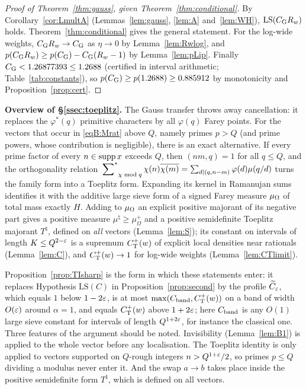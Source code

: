 \documentclass[11pt]{amsart}
\theoremstyle{definition}
\theoremstyle{remark}
\numberwithin{equation}{section}
\newcommand{\inputlemma}[1]{}
\begin{document}
\inputlemma{lemma-A}

\begin{proof}[Proof of Theorem~\ref{thm:gauss}, given Theorem~\ref{thm:conditional}]
By Corollary~\ref{cor:LmultA} (Lemmas~\ref{lem:gauss}, \ref{lem:A} and~\ref{lem:WH}), $\mathrm{LS}(C_{\mathrm G}R_w)$ holds. Theorem~\ref{thm:conditional} gives the general statement. For the log-wide weights, $C_{\mathrm G} R_w\to C_{\mathrm G}$ as $\eta\to0$ by Lemma~\ref{lem:Rwlog}, and $p(C_{\mathrm G}R_w)\ge p(C_{\mathrm G})-C_{\mathrm G}(R_w-1)$ by Lemma~\ref{lem:pLip}. Finally $C_{\mathrm G}<1.26877393\le1.2688$ (certified in interval arithmetic; Table~\ref{tab:constants}), so $p(C_{\mathrm G})\ge p(1.2688)\ge0.885912$ by monotonicity and Proposition~\ref{prop:cert}.
\end{proof}

\medskip\noindent\textbf{Overview of \S\ref{ssec:toeplitz}.} The Gauss transfer throws away cancellation: it replaces the $\varphi^*(q)$ primitive characters by all $\varphi(q)$ Farey points. For the vectors that occur in \eqref{eqB:Mrat} above $Q$, namely primes $p>Q$ (and prime powers, whose contribution is negligible), there is an exact alternative. If every prime factor of every $n\in\operatorname{supp} x$ exceeds $Q$, then $(nm,q)=1$ for all $q\le Q$, and the orthogonality relation $\sideset{}{^{*}}\sum_{\chi\bmod q}\chi(n)\overline{\chi(m)}=\sum_{d\mid(q,n-m)}\varphi(d)\mu(q/d)$ turns the family form into a Toeplitz form. Expanding its kernel in Ramanujan sums identifies it with the additive large sieve form of a signed Farey measure $\mu_{\Omega}$ of total mass exactly $H$. Adding to $\mu_{\Omega}$ an explicit positive majorant of its negative part gives a positive measure $\mu^\natural\ge\mu_\Omega^+$ and a positive semidefinite Toeplitz majorant $T^\natural$, defined on \emph{all} vectors (Lemma~\ref{lem:S}); its constant on intervals of length $K\le Q^{2-\varepsilon}$ is a supremum $C^{+}_{\mathrm T}(w)$ of explicit local densities near rationals (Lemma~\ref{lem:C}), and $C^{+}_{\mathrm T}(w)\to1$ for log-wide weights (Lemma~\ref{lem:CTlimit}).

\inputlemma{lemma-toeplitz-C}

Proposition~\ref{prop:TIsharp} is the form in which these statements enter: it replaces Hypothesis $\mathrm{LS}(C)$ in Proposition~\ref{prop:second} by the profile $\widetilde C_\varepsilon$, which equals $1$ below $1-2\varepsilon$, is at most $\max(C_{\rm band},C^{+}_{\mathrm T}(w))$ on a band of width $O(\varepsilon)$ around $\alpha=1$, and equals $C^{+}_{\mathrm T}(w)$ above $1+2\varepsilon$; here $C_{\rm band}$ is any $O(1)$ large sieve constant for intervals of length $Q^{1+2\varepsilon}$, for instance the classical one. Three features of the argument should be noted. Invisibility (Lemma~\ref{lem:B1}) is applied to the whole vector before any localisation. The Toeplitz identity is only applied to vectors supported on $Q$-rough integers $n>Q^{1+\varepsilon}/2$, so primes $p\le Q$ dividing a modulus never enter it. And the swap $a\to b$ takes place inside the positive semidefinite form $T^\natural$, which is defined on all vectors.
\end{document}
